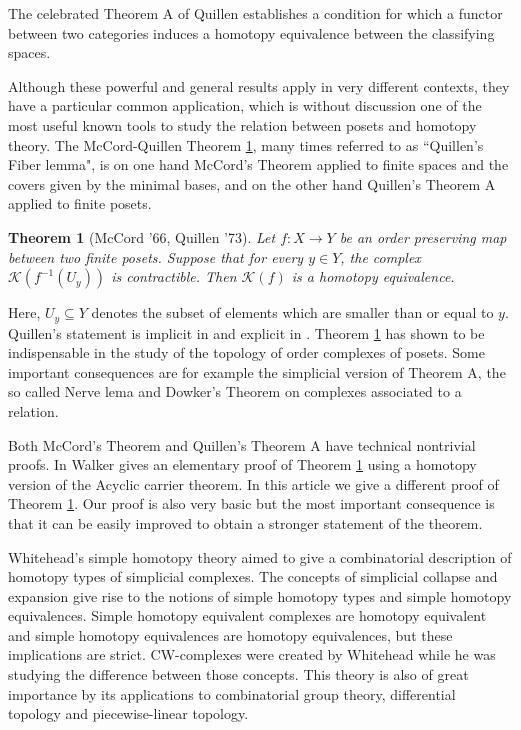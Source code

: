 \documentclass[11pt,twoside]{amsart}
\theoremstyle{plain}
\newtheorem{teo}[lema]{Theorem}
\newtheorem{coro}[lema]{Corollary}
\theoremstyle{remark}
\theoremstyle{definition}
\newcommand{\kp}{\mathcal{K}}
\begin{document}
The celebrated Theorem A of Quillen \cite{Qui2} establishes a condition for which a functor between two categories induces a homotopy equivalence between the classifying spaces.

Although these powerful and general results apply in very different contexts, they have a particular common application, which is without discussion one of the most useful known tools to study the relation between posets and homotopy theory. The McCord-Quillen Theorem \ref{ppal}, many times referred to as ``Quillen's Fiber lemma", is on one hand McCord's Theorem applied to finite spaces and the covers given by the minimal bases, and on the other hand Quillen's Theorem A applied to finite posets.   

\begin{teo}[McCord '66, Quillen '73] \label{ppal}
Let $f:X\to Y$ be an order preserving map between two finite posets. Suppose that for every $y\in Y$, the complex $\kp(f^{-1}(U_y))$ is contractible. Then $\kp(f)$ is a homotopy equivalence.  
\end{teo}    
Here, $U_y\subseteq Y$ denotes the subset of elements which are smaller than or equal to $y$. Quillen's statement is implicit in \cite{Qui2} and explicit in \cite[Proposition 1.6]{Qui}. Theorem \ref{ppal} has shown to be indispensable in the study of the topology of order complexes of posets. Some important consequences are for example the simplicial version of Theorem A, the so called Nerve lema and Dowker's Theorem on complexes associated to a relation.


Both McCord's Theorem and Quillen's Theorem A have technical nontrivial proofs. In \cite{Wal} Walker gives an elementary proof of Theorem \ref{ppal} using a homotopy version of the Acyclic carrier theorem. In this article we give a different proof of Theorem \ref{ppal}. Our proof is also very basic but the most important consequence is that it can be easily improved to obtain a stronger statement of the theorem.

Whitehead's simple homotopy theory aimed to give a combinatorial description of homotopy types of simplicial complexes. The concepts of simplicial collapse and expansion give rise to the notions of simple homotopy types and simple homotopy equivalences. Simple homotopy equivalent complexes are homotopy equivalent and simple homotopy equivalences are homotopy equivalences, but these implications are strict. CW-complexes were created by Whitehead while he was studying the difference between those concepts. This theory is also of great importance by its applications to combinatorial group theory, differential topology and piecewise-linear topology.
\end{document}
